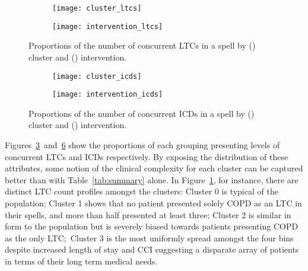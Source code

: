 \begin{figure}
    \centering
    \begin{subfigure}{\halfimgwidth}
        \texttt{[image: cluster\_ltcs]}
        \caption{}\label{fig:cluster_ltcs}
    \end{subfigure}\hfill%
    \begin{subfigure}{\halfimgwidth}
        \texttt{[image: intervention\_ltcs]}
        \caption{}\label{fig:intervention_ltcs}
    \end{subfigure}
    \caption{%
        Proportions of the number of concurrent LTCs in a spell by
        () cluster and ()
        intervention.
    }\label{fig:ltcs}
\end{figure}

\begin{figure}
    \centering
    \begin{subfigure}{\halfimgwidth}
        \texttt{[image: cluster\_icds]}
        \caption{}\label{fig:cluster_icds}
    \end{subfigure}\hfill%
    \begin{subfigure}{\halfimgwidth}
        \texttt{[image: intervention\_icds]}
        \caption{}\label{fig:intervention_icds}
    \end{subfigure}
    \caption{%
        Proportions of the number of concurrent ICDs in a spell by
        () cluster and ()
        intervention.
    }\label{fig:icds}
\end{figure}

Figures~\ref{fig:ltcs}~and~\ref{fig:icds} show the proportions of each grouping
presenting levels of concurrent LTCs and ICDs respectively. By exposing the
distribution of these attributes, some notion of the clinical complexity for
each cluster can be captured better than with Table~\ref{tab:summary} alone. In
Figure~\ref{fig:cluster_ltcs}, for instance, there are distinct LTC count
profiles amongst the clusters: Cluster 0 is typical of the population; Cluster 1
shows that no patient presented solely COPD as an LTC in their spells, and more
than half presented at least three; Cluster 2 is similar in form to the
population but is severely biased towards patients presenting COPD as the only
LTC;\ Cluster 3 is the most uniformly spread amongst the four bins despite
increased length of stay and CCI suggesting a disparate array of patients in
terms of their long term medical needs.

